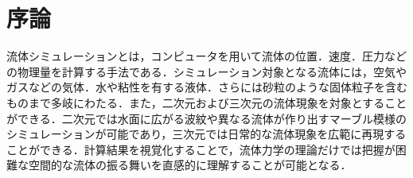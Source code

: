 \documentclass[a4j,12pt]{jreport}
\begin{document}
\newpage
{}

\chapter{序論} \label{chapter:1}





流体シミュレーションとは，コンピュータを用いて流体の位置．速度．圧力などの物理量を計算する手法である．シミュレーション対象となる流体には，空気やガスなどの気体．水や粘性を有する液体．さらには砂粒のような固体粒子を含むものまで多岐にわたる．また，二次元および三次元の流体現象を対象とすることができる．二次元では水面に広がる波紋や異なる流体が作り出すマーブル模様のシミュレーションが可能であり，三次元では日常的な流体現象を広範に再現することができる．計算結果を視覚化することで，流体力学の理論だけでは把握が困難な空間的な流体の振る舞いを直感的に理解することが可能となる．
\end{document}
